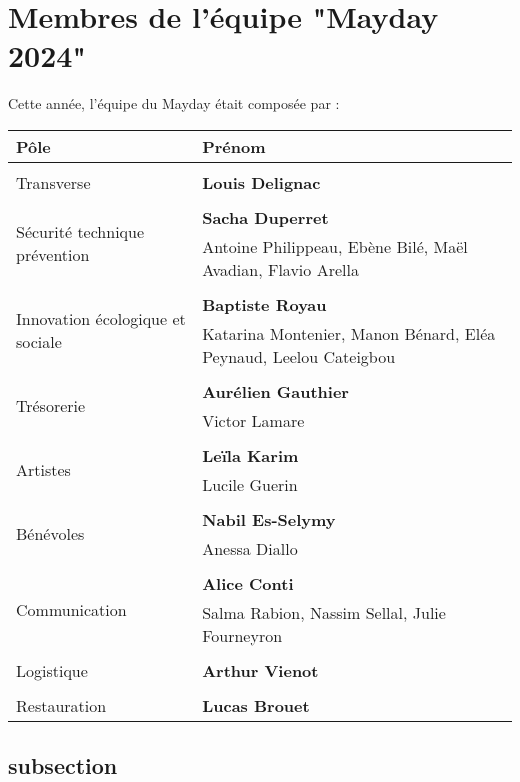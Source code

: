 \documentclass[12pt,a4paper]{report}
\begin{document}
\section{Membres de l'équipe "Mayday 2024"}
Cette année, l'équipe du Mayday était composée par :
\begin{center}
\begin{tabular}{| m{3cm} | m{7cm} |}
\hline
Pôle & Prénom \\ 
 \hline\hline\\
Transverse & \textbf{Louis Delignac}\\ 
\hline\\
\multirow{2}{5em}{Sécurité technique prévention} & \textbf{Sacha Duperret} \\ 
& Antoine Philippeau, Ebène Bilé, Maël Avadian, Flavio Arella\\  
 \hline\\
 \multirow{2}{5em}{Innovation écologique et sociale} & \textbf{Baptiste Royau} \\ 
& Katarina Montenier, Manon Bénard, Eléa Peynaud, Leelou Cateigbou\\
 \hline\\
  \multirow{2}{5em}{Trésorerie} & \textbf{Aurélien Gauthier} \\ 
& Victor Lamare\\
 \hline\\
 \multirow{2}{5em}{ Artistes} & \textbf{Leïla Karim} \\
& Lucile Guerin\\
 \hline\\
\multirow{2}{5em}{Bénévoles} & \textbf{Nabil Es-Selymy} \\ 
& Anessa Diallo\\
 \hline\\
\multirow{2}{5em}{Communication} & \textbf{Alice Conti} \\ 
& Salma Rabion, Nassim Sellal, Julie Fourneyron\\
 \hline\\
 \multirow{1}{5em}{Logistique} & \textbf{Arthur Vienot} \\ 
 \hline\\
 \multirow{1}{5em}{Restauration} & \textbf{Lucas Brouet} \\ 
 \hline
\end{tabular}
\end{center}



\subsection{subsection}
\end{document}
